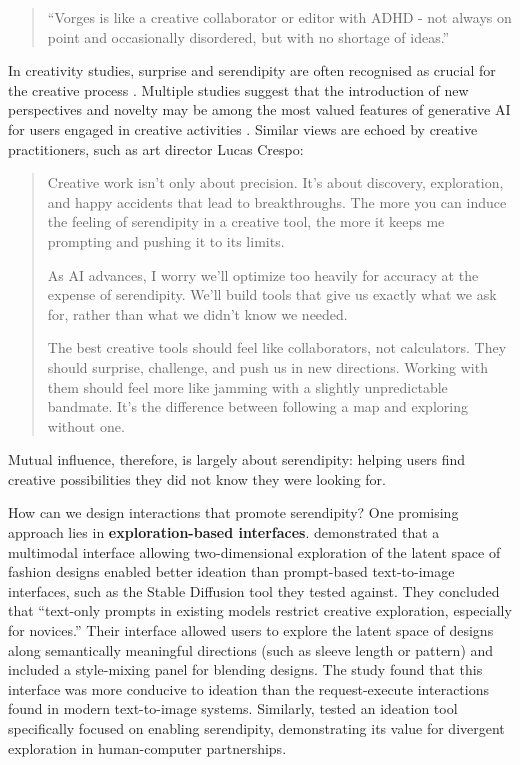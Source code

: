 \begin{quote}
``Vorges is like a creative collaborator or editor with ADHD - not always on point and occasionally disordered, but with no shortage of ideas.''
\end{quote}

In creativity studies, surprise and serendipity are often recognised as crucial for the creative process \citep{Simon1967-nr, Lubart2001-vl, Grace2015-uc, Moruzzi2022-gp}. Multiple studies suggest that the introduction of new perspectives and novelty may be among the most valued features of generative AI for users engaged in creative activities \citep{Lawton2023-tb, Park2024-gw, Koch2020-gx}. Similar views are echoed by creative practitioners, such as art director Lucas Crespo:

\begin{quote}
Creative work isn't only about precision. It's about discovery, exploration, and happy accidents that lead to breakthroughs. The more you can induce the feeling of serendipity in a creative tool, the more it keeps me prompting and pushing it to its limits.

As AI advances, I worry we'll optimize too heavily for accuracy at the expense of serendipity. We'll build tools that give us exactly what we ask for, rather than what we didn't know we needed.

The best creative tools should feel like collaborators, not calculators. They should surprise, challenge, and push us in new directions. Working with them should feel more like jamming with a slightly unpredictable bandmate. It's the difference between following a map and exploring without one. \citep{Crespo2025-wr}
\end{quote}

Mutual influence, therefore, is largely about serendipity: helping users find creative possibilities they did not know they were looking for.

How can we design interactions that promote serendipity? One promising approach lies in \textbf{exploration-based interfaces}. \citet{Davis2024-ml} demonstrated that a multimodal interface allowing two-dimensional exploration of the latent space of fashion designs enabled better ideation than prompt-based text-to-image interfaces, such as the Stable Diffusion tool they tested against. They concluded that ``text-only prompts in existing models restrict creative exploration, especially for novices.'' Their interface allowed users to explore the latent space of designs along semantically meaningful directions (such as sleeve length or pattern) and included a style-mixing panel for blending designs. The study found that this interface was more conducive to ideation than the request-execute interactions found in modern text-to-image systems. Similarly, \citet{Koch2020-gx} tested an ideation tool specifically focused on enabling serendipity, demonstrating its value for divergent exploration in human-computer partnerships.

